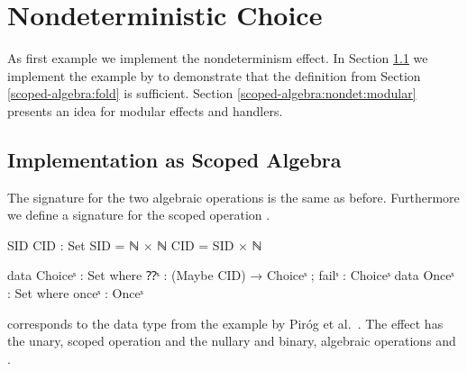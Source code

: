 \section{Nondeterministic Choice}

As first example we implement the nondeterminism effect.
In Section \ref{scoped-algebra:nondet:scoped-algebra} we implement the example
by \textcite{DBLP:conf/lics/PirogSWJ18} to demonstrate that the
 definition from Section \ref{scoped-algebra:fold} is
sufficient.
Section \ref{scoped-algebra:nondet:modular} presents an idea for modular effects
and handlers.

\subsection{Implementation as Scoped Algebra}
\label{scoped-algebra:nondet:scoped-algebra}
The signature for the two algebraic operations is the same as before.
Furthermore we define a signature for the scoped operation .

\begin{code}[hide]
SID CID : Set
SID = ℕ × ℕ
CID = SID × ℕ
\end{code}
\begin{code}
data Choiceˢ  : Set where ⁇ˢ : (Maybe CID) → Choiceˢ ; failˢ : Choiceˢ
data Onceˢ    : Set where onceˢ : Onceˢ
\end{code}
 corresponds to the data type from the example by Piróg et
al.~\cite[sec.~6]{DBLP:conf/lics/PirogSWJ18}.
The effect has the unary, scoped operation  and the nullary
and binary, algebraic operations  and .

